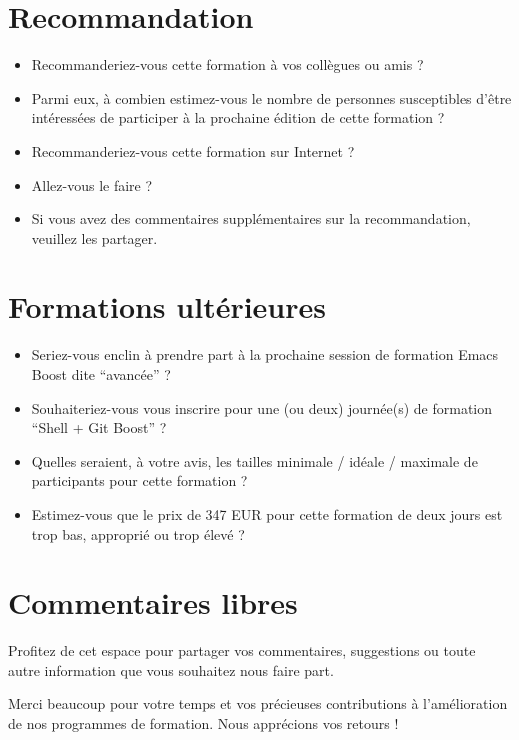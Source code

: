 \documentclass[final]{mcarticle}
\begin{document}
\section{Recommandation}
\label{sec:orga288e0f}

\begin{itemize}
\item Recommanderiez-vous cette formation à vos collègues ou amis ?

\item Parmi eux, à combien estimez-vous le nombre de personnes susceptibles d'être intéressées
de participer à la prochaine édition de cette formation ?

\item Recommanderiez-vous cette formation sur Internet ?

\item Allez-vous le faire ?

\item Si vous avez des commentaires supplémentaires sur la recommandation, veuillez
les partager.
\end{itemize}

\vspace{13pt}

\section{Formations ultérieures}
\label{sec:org795fc71}

\begin{itemize}
\item Seriez-vous enclin à prendre part à la prochaine session de formation Emacs
Boost dite ``avancée'' ?

\item Souhaiteriez-vous vous inscrire pour une (ou deux) journée(s) de formation
``Shell + Git Boost'' ?

\item Quelles seraient, à votre avis, les tailles minimale / idéale / maximale de
participants pour cette formation ?

\item Estimez-vous que le prix de 347 EUR pour cette formation de deux jours est
trop bas, approprié ou trop élevé ?
\end{itemize}

\section{Commentaires libres}
\label{sec:org8c27edc}

Profitez de cet espace pour partager vos commentaires, suggestions ou toute
autre information que vous souhaitez nous faire part.

\vspace{13pt}
\vspace{13pt}

Merci beaucoup pour votre temps et vos précieuses contributions à l'amélioration
de nos programmes de formation. Nous apprécions vos retours !
\end{document}
